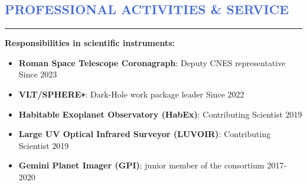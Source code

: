 \documentclass[11pt]{article}
\begin{document}
\vspace{-0.55cm}
\textcolor{RoyalBlue}{\section{\large PROFESSIONAL ACTIVITIES \& SERVICE}
\vspace{-0.35cm}\hrule}
\vspace{0.25cm}


\textbf{Responsibilities in scientific instruments:}
\vspace{0.1cm}

\begin{itemize} \itemsep -2pt
    \item[$\bullet$] \textbf{Roman Space Telescope Coronagraph}: Deputy CNES representative \hfill Since 2023
    \item[$\bullet$] \textbf{VLT/SPHERE\texttt{+}}: Dark-Hole work package leader \hfill Since 2022
    \item[$\bullet$] \textbf{Habitable Exoplanet Observatory (HabEx)}: Contributing Scientist \hfill  2019
    \item[$\bullet$] \textbf{Large UV Optical Infrared Surveyor (LUVOIR)}: Contributing Scientist  \hfill 2019
    \item[$\bullet$] \textbf{Gemini Planet Imager (GPI)}: junior member of the consortium \hfill 2017-2020
\end{itemize}
\end{document}
